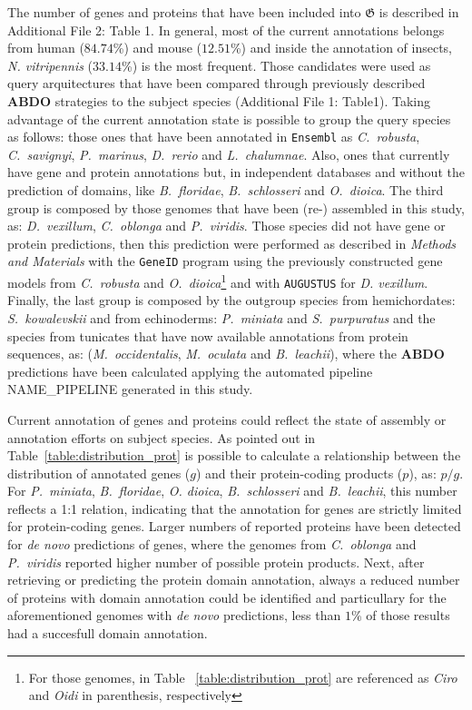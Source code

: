 \documentclass[11pt]{article}
\newcommand{\TODO}[1]{\begingroup\color{red}#1\endgroup}
\begin{document}
The number of genes and proteins that have been included into $\boldsymbol{\mathfrak{G}}$ 
is described in Additional File 2: Table 1. In general, most of the current 
annotations belongs from human ($84.74$\%) and mouse ($12.51$\%) and inside the 
annotation of insects, \textit{N. vitripennis} ($33.14$\%) is the most frequent. 
Those candidates were used as query arquitectures that have been compared through previously 
described \textbf{ABDO} strategies to the subject species (Additional File 1: Table1). 
Taking advantage of the current annotation state is possible to group the query 
species as follows: those ones that have been annotated in \texttt{Ensembl} as
\textit{C.\ robusta}, \textit{C.\ savignyi}, \textit{P.\ marinus}, \textit{D.\ 
rerio} and \textit{L.\ chalumnae}. Also, ones that currently have gene and protein annotations 
but, in independent databases and without the prediction of domains, like \textit{B.\ floridae}, 
\textit{B.\ schlosseri} and \textit{O.\ dioica}. The third group is composed by those 
genomes that have been (re-) assembled in this study, as: \textit{D.\ vexillum}, \textit{C.\ oblonga} and 
\textit{P.\ viridis}. Those species did not have gene or protein predictions, then this 
prediction were performed as described in \textsl{Methods and Materials} with the 
\texttt{GeneID} program using the previously constructed gene models from 
\textit{C.\ robusta} and \textit{O.\ dioica}\footnote{For those genomes, in Table 
~\ref{table:distribution_prot} are referenced as \textsl{Ciro} and \textsl{Oidi} in parenthesis,
respectively} and with \texttt{AUGUSTUS} for \textit{D. vexillum}. Finally, the last group 
is composed by the outgroup species from hemichordates: \textit{S.\ kowalevskii} and from 
echinoderms: \textit{P.\ miniata} and \textit{S.\ purpuratus} and the species from 
tunicates that have now available annotations from protein sequences, as: (\textit{M.\ occidentalis}, 
\textit{M.\ oculata} and \textit{B.\ leachii}), where the \textbf{ABDO} predictions have 
been calculated applying the automated pipeline \TODO{NAME\_PIPELINE} generated in this study.

Current annotation of genes and proteins could reflect the state of assembly
or annotation efforts on subject species. As pointed out in Table~\ref{table:distribution_prot}
is possible to calculate a relationship between the distribution of annotated genes ($g$) and 
their protein-coding products ($p$), as: $p/g$. For \textit{P.\ miniata}, \textit{B.\ floridae}, 
\textit{O. dioica}, \textit{B.\ schlosseri} and \textit{B.\ leachii}, this number reflects a 
1:1 relation, indicating that the annotation for genes are strictly limited for protein-coding genes. 
Larger numbers of reported proteins have been detected for \textit{de novo} predictions of genes, 
where the genomes from \textit{C.\ oblonga} and \textit{P.\ viridis} reported higher number 
of possible protein products. Next, after retrieving or predicting the protein domain annotation, 
always a reduced number of proteins with domain annotation could be identified and particullary for 
the aforementioned genomes with \textit{de novo} predictions, less than $1\%$ of those results had 
a succesfull domain annotation. 
\end{document}
